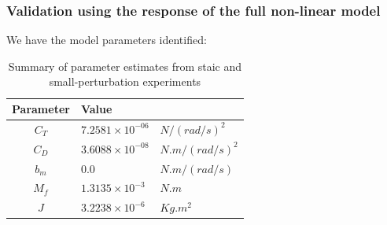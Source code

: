 \subsubsection{Validation using the response of the full non-linear model}
We have the model parameters identified:
\begin{table}[H]
    \centering
    \begin{tabular}{c l l}
        \hline \hline
        Parameter & Value & \\ \hline \hline
        $C_T$ & $7.2581 \times 10^{-06}$ & $N/(rad/s)^2$  \\
        $C_D$ & $3.6088 \times 10^{-08}$ & $N.m/(rad/s)^2$ \\
        $b_m$ & $0.0$                    & $N.m/(rad/s)$\\
        $M_f$ & $1.3135 \times 10^{-3}$  & $N.m$\\
        $J$   & $3.2238 \times 10^{-6}$  & $Kg .m^2$ \\\hline \hline
    \end{tabular}
    \caption{Summary of parameter estimates from staic and small-perturbation experiments}
\end{table}

